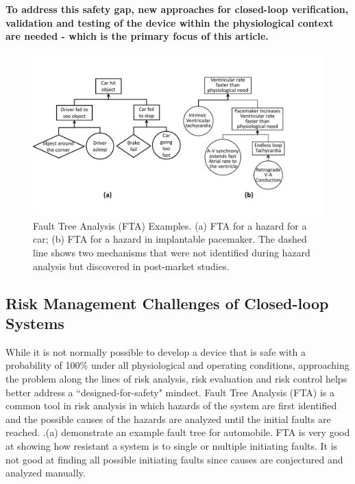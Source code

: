 \textbf{To address this safety gap, new approaches for closed-loop verification, validation and testing of the device within the physiological context are needed - which is the primary focus of this article.}
\begin{figure}[t]
		\centering
		\includegraphics[width=\textwidth]{figs/fta_new.pdf}
		\caption{\small Fault Tree Analysis (FTA) Examples. (a) FTA for a hazard for a car; (b) FTA for a hazard in implantable pacemaker. The dashed line shows two mechanisms that were not identified during hazard analysis but discovered in post-market studies.}
		\label{fig:risks}
\end{figure}
\subsection{Risk Management Challenges of Closed-loop Systems}
While it is not normally possible to develop a device that is safe with a probability of 100\% under all physiological and operating conditions, approaching the problem along the lines of risk analysis, risk evaluation and risk control helps better address a ``designed-for-safety" mindset. Fault Tree Analysis (FTA) is a common tool in risk analysis in which hazards of the system are first identified and the possible causes of the hazards are analyzed until the initial faults are reached. .(a) demonstrate an example fault tree for automobile. FTA is very good at showing how resistant a system is to single or multiple initiating faults. It is not good at finding all possible initiating faults since causes are conjectured and analyzed manually. 

